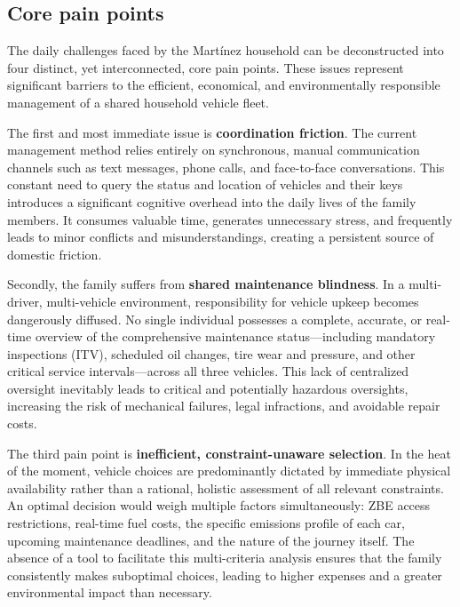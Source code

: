 \subsection{Core pain points}

The daily challenges faced by the Martínez household can be deconstructed into four distinct, yet interconnected, core pain points. These issues represent significant barriers to the efficient, economical, and environmentally responsible management of a shared household vehicle fleet.

\textgap

The first and most immediate issue is \textbf{coordination friction}. The current management method relies entirely on synchronous, manual communication channels such as text messages, phone calls, and face-to-face conversations. This constant need to query the status and location of vehicles and their keys introduces a significant cognitive overhead into the daily lives of the family members. It consumes valuable time, generates unnecessary stress, and frequently leads to minor conflicts and misunderstandings, creating a persistent source of domestic friction.

\textgap

Secondly, the family suffers from \textbf{shared maintenance blindness}. In a multi-driver, multi-vehicle environment, responsibility for vehicle upkeep becomes dangerously diffused. No single individual possesses a complete, accurate, or real-time overview of the comprehensive maintenance status—including mandatory inspections (ITV), scheduled oil changes, tire wear and pressure, and other critical service intervals—across all three vehicles. This lack of centralized oversight inevitably leads to critical and potentially hazardous oversights, increasing the risk of mechanical failures, legal infractions, and avoidable repair costs.

\textgap

The third pain point is \textbf{inefficient, constraint-unaware selection}. In the heat of the moment, vehicle choices are predominantly dictated by immediate physical availability rather than a rational, holistic assessment of all relevant constraints. An optimal decision would weigh multiple factors simultaneously: ZBE access restrictions, real-time fuel costs, the specific emissions profile of each car, upcoming maintenance deadlines, and the nature of the journey itself. The absence of a tool to facilitate this multi-criteria analysis ensures that the family consistently makes suboptimal choices, leading to higher expenses and a greater environmental impact than necessary.

